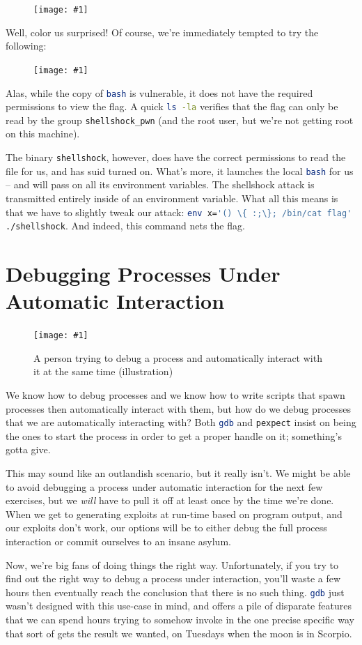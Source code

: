\documentclass{article}
\newcommand{\displayimage}[1] {
\begin{figure}[H]
    \centering
    \texttt{[image: \#1]} 
\end{figure}
}
\newcommand{\wrapimagerightcap}[2] {
    \begin{figure}\begin{center}\texttt{[image: \#1]}\end{center}\caption{#2}\end{figure}}
\newcommand{\xcode}[2]{\colorbox{ubuntuback}{\lstinline[language=#1]|#2|}}
\begin{document}
\displayimage{../09_shellshock/vulnerable.png}

Well, color us surprised! Of course, we're immediately tempted to try the following:

\displayimage{../09_shellshock/permission_denied.png}

Alas, while the copy of \xcode{bash}{bash} is vulnerable, it does not have the required permissions to view the flag. A quick \xcode{bash}{ls -la} verifies that the flag can only be read by the group \xcode{bash}{shellshock_pwn} (and the root user, but we're not getting root on this machine).

The binary \xcode{bash}{shellshock}, however, does have the correct permissions to read the file for us, and has suid turned on. What's more, it launches the local \xcode{bash}{bash} for us -- and will pass on all its environment variables. The shellshock attack is transmitted entirely inside of an environment variable. What all this means is that we have to slightly tweak our attack: \xcode{bash}{env x='() \{ :;\}; /bin/cat flag' ./shellshock}. And indeed, this command nets the flag. 

\section{Debugging Processes Under Automatic Interaction}

\wrapimagerightcap{./images/debugging_interaction.png}{A person trying to debug a process and automatically interact with it at the same time (illustration)}
We know how to debug processes and we know how to write scripts that spawn processes then automatically interact with them, but how do we debug processes that we are automatically interacting with? Both \xcode{bash}{gdb} and \xcode{python}{pexpect} insist on being the ones to start the process in order to get a proper handle on it; something's gotta give.

This may sound like an outlandish scenario, but it really isn't. We might be able to avoid debugging a process under automatic interaction for the next few exercises, but we \textit{will} have to pull it off at least once by the time we're done. When we get to generating exploits at run-time based on program output, and our exploits don't work, our options will be to either debug the full process interaction or commit ourselves to an insane asylum.

Now, we're big fans of doing things the right way. Unfortunately, if you try to find out the right way to debug a process under interaction, you'll waste a few hours then eventually reach the conclusion that there is no such thing. \xcode{bash}{gdb} just wasn't designed with this use-case in mind, and offers a pile of disparate features that we can spend hours trying to somehow invoke in the one precise specific way that sort of gets the result we wanted, on Tuesdays when the moon is in Scorpio. 
\end{document}
